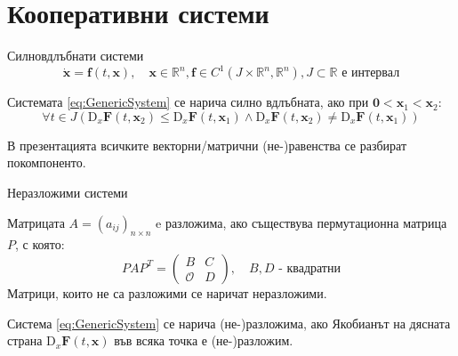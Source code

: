 \section{Кооперативни системи}
\begin{frame}[t]{Силновдлъбнати системи}
  \begin{equation}
    \label{eq:GenericSystem}
    \dot{\boldsymbol{x}} = \boldsymbol{f}(t, \boldsymbol{x}),  \quad \boldsymbol{x} \in \mathbb{R}^n, \boldsymbol{f} \in C^1(J \times \mathbb{R}^n, \mathbb{R}^n), J \subset \mathbb{R} \text{ е интервал}
    \end{equation}

\begin{definition}
  Системата \ref{eq:GenericSystem} се нарича силно вдлъбната, ако при $\boldsymbol{0} < \boldsymbol{x}_1 < \boldsymbol{x}_2$:
  \begin{equation}
     \forall{t \in J} \left(\mathrm{D}_x\boldsymbol{F}(t, \boldsymbol{x}_2) \leq \mathrm{D}_x\boldsymbol{F}(t, \boldsymbol{x}_1) \wedge \mathrm{D}_x\boldsymbol{F}(t, \boldsymbol{x}_2) \neq \mathrm{D}_x\boldsymbol{F}(t, \boldsymbol{x}_1)\right)
    \end{equation}
  \end{definition}

  \begin{nota-bene}
    В презентацията всичките векторни/матрични (не-)равенства се разбират покомпоненто.
  \end{nota-bene}
\end{frame}

\begin{frame}[t]{Неразложими системи}
  \begin{definition}
    Матрицата $A=(a_{ij})_{n \times n}$ e разложима, ако съществува пермутационна матрица $P$, с която:
    \begin{equation*}
      PAP^T =
      \begin{pmatrix}
        B & C \\
        \mathscr{O} & D
      \end{pmatrix}, \quad B, D \text{ - квадратни}
    \end{equation*}
    Матрици, които не са разложими се наричат неразложими.
  \end{definition}
  \begin{definition}
    Система \ref{eq:GenericSystem} се нарича (не-)разложима, ако Якобианът на дясната страна $\mathrm{D}_x\boldsymbol{F}(t, \boldsymbol{x})$ във всяка точка е (не-)разложим.
  \end{definition}

\end{frame}

